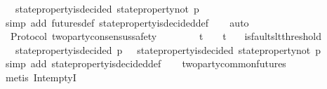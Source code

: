 \begin{isabellebody}
\ \ {\isasymlongrightarrow}\ {\isasymnot}state{\isacharunderscore}property{\isacharunderscore}is{\isacharunderscore}decided\ {\isacharparenleft}state{\isacharunderscore}property{\isacharunderscore}not\ p{\isacharcomma}\ {\isasymsigma}{\isacharparenright}{\isachardoublequoteclose}\isanewline
%
\isadelimproof
\ \ %
\endisadelimproof
%
\isatagproof
{}\isamarkupfalse%
\ {\isacharparenleft}simp\ add{\isacharcolon}\ futures{\isacharunderscore}def\ state{\isacharunderscore}property{\isacharunderscore}is{\isacharunderscore}decided{\isacharunderscore}def{\isacharparenright}\isanewline
\ \ \isamarkupfalse%
\ auto%
\endisatagproof
{\isafoldproof}%
%
\isadelimproof
\isanewline
%
\endisadelimproof
\ \ \isanewline
\isanewline
{}\isamarkupfalse%
\ {\isacharparenleft}\ Protocol{\isacharparenright}\ two{\isacharunderscore}party{\isacharunderscore}consensus{\isacharunderscore}safety\ {\isacharcolon}\isanewline
\ \ {\isachardoublequoteopen}{\isasymforall}\ {\isasymsigma}{}\ {\isasymsigma}{}{\isachardot}\ {\isasymsigma}{}\ {\isasymin}\ {\isasymSigma}t\ {\isasymand}\ {\isasymsigma}{}\ {\isasymin}\ {\isasymSigma}t\isanewline
\ \ {\isasymlongrightarrow}\ is{\isacharunderscore}faults{\isacharunderscore}lt{\isacharunderscore}threshold\ {\isacharparenleft}{\isasymsigma}{}\ {\isasymunion}\ {\isasymsigma}{}{\isacharparenright}\isanewline
\ \ {\isasymlongrightarrow}\ {\isasymnot}{\isacharparenleft}state{\isacharunderscore}property{\isacharunderscore}is{\isacharunderscore}decided\ {\isacharparenleft}p{\isacharcomma}\ {\isasymsigma}{}{\isacharparenright}\ {\isasymand}\ state{\isacharunderscore}property{\isacharunderscore}is{\isacharunderscore}decided\ {\isacharparenleft}state{\isacharunderscore}property{\isacharunderscore}not\ p{\isacharcomma}\ {\isasymsigma}{}{\isacharparenright}{\isacharparenright}{\isachardoublequoteclose}\isanewline
%
\isadelimproof
\ \ %
\endisadelimproof
%
\isatagproof
{}\isamarkupfalse%
\ {\isacharparenleft}simp\ add{\isacharcolon}\ state{\isacharunderscore}property{\isacharunderscore}is{\isacharunderscore}decided{\isacharunderscore}def{\isacharparenright}\isanewline
\ \ \isamarkupfalse%
\ two{\isacharunderscore}party{\isacharunderscore}common{\isacharunderscore}futures\isanewline
\ \ \isamarkupfalse%
\ {\isacharparenleft}metis\ Int{\isacharunderscore}emptyI{\isacharparenright}%
\endisatagproof
{\isafoldproof}%
%
\isadelimproof
\isanewline
%
\endisadelimproof

\end{isabellebody}
